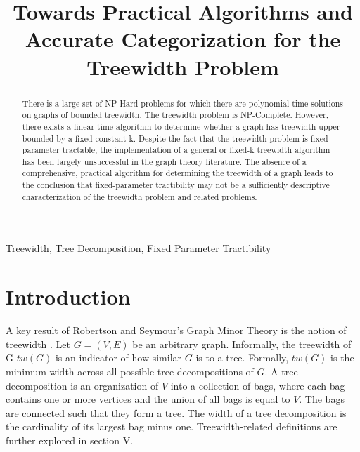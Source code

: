 \documentclass[12pt,conference]{IEEEtran}
\theoremstyle{plain}
\begin{document}
\raggedbottom

\title{Towards Practical Algorithms and Accurate Categorization for the Treewidth Problem}

\author{
}

\maketitle

\begin{abstract}
There is a large set of NP-Hard problems for which there are polynomial time solutions on graphs of bounded treewidth. The treewidth problem is NP-Complete. However, there exists a linear time algorithm to determine whether a graph has treewidth upper-bounded by a fixed constant k. Despite the fact that the treewidth problem is fixed-parameter tractable, the implementation of a general or fixed-k treewidth algorithm has been largely unsuccessful in the graph theory literature. The absence of a comprehensive, practical algorithm for determining the treewidth of a graph leads to the conclusion that fixed-parameter tractibility may not be a sufficiently descriptive characterization of the treewidth problem and related problems.
\end{abstract}

\begin{IEEEkeywords}
Treewidth, Tree Decomposition, Fixed Parameter Tractibility
\end{IEEEkeywords}

\IEEEpeerreviewmaketitle

\section{Introduction}
A key result of Robertson and Seymour's Graph Minor Theory is the notion of treewidth \cite{treewidth-rob-seymour}. Let $G = (V,E)$ be an arbitrary graph. Informally, the treewidth of G $tw(G)$ is an indicator of how similar $G$ is to a tree. Formally, $tw(G)$ is the minimum width across all possible tree decompositions of $G$. A tree decomposition is an organization of $V$ into a collection of bags, where each bag contains one or more vertices and the union of all bags is equal to $V$. The bags are connected such that they form a tree. The width of a tree decomposition is the cardinality of its largest bag minus one. Treewidth-related definitions are further explored in section V.
\end{document}

